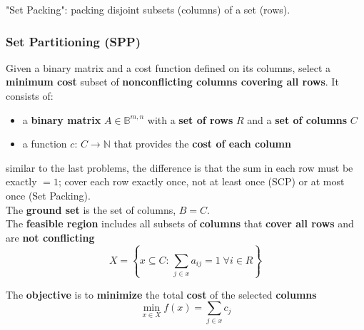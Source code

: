 \documentclass[11pt]{article}
\begin{document}
	"Set Packing": packing disjoint subsets (columns) of a set (rows).\\
	
	\newpage
	
	\subsubsection{Set Partitioning (SPP)}
	Given a binary matrix and a cost function defined on its columns, select a \textbf{minimum cost} subset of \textbf{nonconflicting columns covering all rows}. It consists of:
	\begin{itemize}
		\item a \textbf{binary matrix} $A \in \mathbb{B}^{m,n}$ with a \textbf{set of rows} $R$ and a \textbf{set of
		columns} $C$
		\item a function $c : \, C \rightarrow \mathbb{N}$ that provides the \textbf{cost of each column}
	\end{itemize}
	similar to the last problems, the difference is that the sum in each row must be exactly $= 1$; cover each row exactly once, not at least once (SCP) or at most once (Set Packing).\\
	
	The \textbf{ground set} is the set of columns, $B = C$.\\
	
	The \textbf{feasible region} includes all subsets of \textbf{columns} that \textbf{cover all rows} and are \textbf{not conflicting}
	$$ X = \left\{x \subseteq C : \, \sum_{j \in x} a_{ij} = 1 \; \forall i \in R \right\}$$
	
	The \textbf{objective} is to \textbf{minimize} the total \textbf{cost} of the selected \textbf{columns}
	$$ \min_{x \in X} f(x) = \sum_{j \in x} c_j $$
	
	\newpage
	
\end{document}
